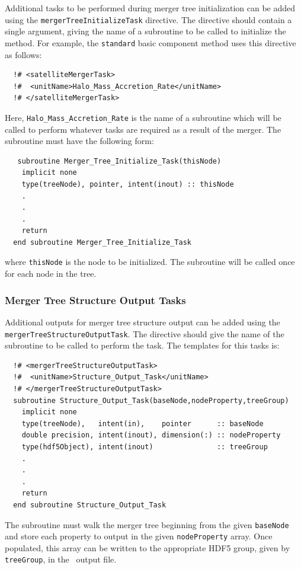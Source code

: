 Additional tasks to be performed during merger tree initialization can be added using the {\tt mergerTreeInitializeTask} directive. The directive should contain a single argument, giving the name of a subroutine to be called to initialize the method. For example, the {\tt standard} basic component method uses this directive as follows:
\begin{verbatim}
  !# <satelliteMergerTask>
  !#  <unitName>Halo_Mass_Accretion_Rate</unitName>
  !# </satelliteMergerTask>
\end{verbatim}
Here, {\tt Halo\_Mass\_Accretion\_Rate} is the name of a subroutine which will be called to perform whatever tasks are required as a result of the merger. The subroutine must have the following form:
\begin{verbatim}
   subroutine Merger_Tree_Initialize_Task(thisNode)
    implicit none
    type(treeNode), pointer, intent(inout) :: thisNode
    .
    .
    .
    return
  end subroutine Merger_Tree_Initialize_Task
\end{verbatim}
where {\tt thisNode} is the node to be initialized. The subroutine will be called once for each node in the tree.

\subsubsection{Merger Tree Structure Output Tasks}

Additional outputs for merger tree structure output can be added using the {\tt mergerTreeStructureOutputTask}. The directive should give the name of the subroutine to be called to perform the task. The templates for this tasks is:
\begin{verbatim}
  !# <mergerTreeStructureOutputTask>
  !#  <unitName>Structure_Output_Task</unitName>
  !# </mergerTreeStructureOutputTask>
  subroutine Structure_Output_Task(baseNode,nodeProperty,treeGroup)
    implicit none
    type(treeNode),   intent(in),    pointer      :: baseNode
    double precision, intent(inout), dimension(:) :: nodeProperty
    type(hdf5Object), intent(inout)               :: treeGroup
    .
    .
    .
    return
  end subroutine Structure_Output_Task
\end{verbatim}
The subroutine must walk the merger tree beginning from the given {\tt baseNode} and store each property to output in the given {\tt nodeProperty} array. Once populated, this array can be written to the appropriate HDF5 group, given by {\tt treeGroup}, in the \glc\ output file.

